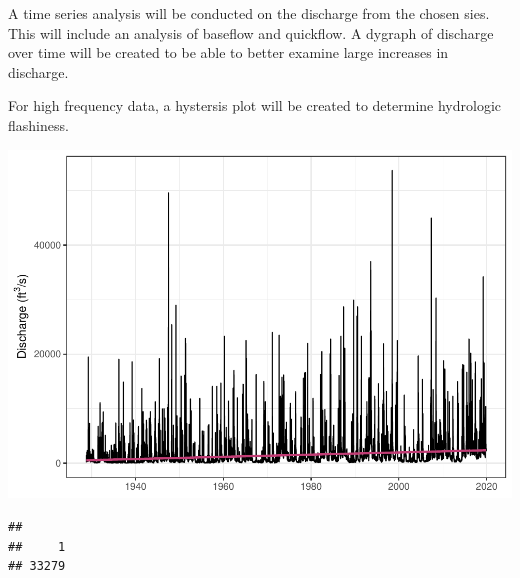 \documentclass[12pt,]{article}
\begin{document}
A time series analysis will be conducted on the discharge from the
chosen sies. This will include an analysis of baseflow and quickflow. A
dygraph of discharge over time will be created to be able to better
examine large increases in discharge.

For high frequency data, a hystersis plot will be created to determine
hydrologic flashiness.

\newpage

\includegraphics{Project_Template_files/figure-latex/unnamed-chunk-6-1.pdf}

\begin{verbatim}
## 
##     1 
## 33279
\end{verbatim}
\end{document}

